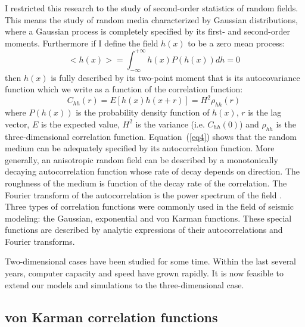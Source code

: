 I restricted this research to the study of second-order statistics of random
fields. This means the study of random media characterized by Gaussian 
distributions, where a Gaussian process is completely specified by its first-
and second-order moments. Furthermore if I define the field $h(x)$ to be 
a zero mean process:
\begin{equation}
<h(x)>=\int_{-\infty}^{+\infty}h(x)P(h(x))dh=0 \
\label {eq3}
\end{equation}
then $h(x)$ is fully described by its two-point moment that is its autocovariance 
function which we write as a function of the correlation function:
\begin{equation}
C_{hh}(r)=E[h(x)h(x+r)]=H^2\rho_{hh}(r) \
\label {eq4}
\end{equation}
where $P(h(x))$ is the probability density function of $h(x)$,
$r$ is the lag vector, $E$ is the expected value, $H^2$ is the variance
(i.e. $C_{hh}(0)$) and $\rho_{hh}$ is the three-dimensional correlation function.
Equation~(\ref {eq4}) shows that the random medium can 
be adequately specified by its 
autocorrelation function. More generally, an anisotropic random field can be
described by a monotonically decaying autocorrelation function whose rate of
decay depends on direction. The roughness of the medium is function of the 
decay rate of the correlation. The Fourier transform of the autocorrelation is 
the power spectrum of the field \cite[]{Bracewell}. Three types of correlation
functions were commonly used in the field of seismic modeling: the Gaussian,
exponential and von Karman functions. These special functions are described by
analytic expressions of their autocorrelations and Fourier transforms. 
\par
Two-dimensional cases have been studied for some
time\cite[]{Wu,Frankel,Goff,Holliger1,Holliger2}.
Within the last several years, computer capacity and speed have grown rapidly.
It is now feasible to extend our models and simulations to the 
three-dimensional case.

\subsection { von Karman correlation functions }

